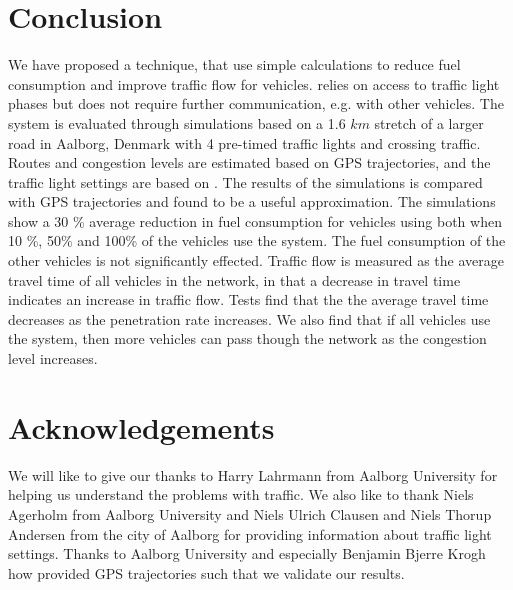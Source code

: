 \section{Conclusion}\label{sec:Conclusion}
We have proposed a technique, \tech that use simple calculations to reduce fuel consumption and improve traffic flow for vehicles.
\tech relies on access to traffic light phases but does not require further communication, e.g. with other vehicles.
The system is evaluated through simulations based on a 1.6 $km$ stretch of a larger road in Aalborg, Denmark with 4 pre-timed traffic lights and crossing traffic.
Routes and congestion levels are estimated based on GPS trajectories, and the traffic light settings are based on \cite{vejtrafik}.
The results of the simulations is compared with GPS trajectories and found to be a useful approximation.
The simulations show a 30 \% average reduction in fuel consumption for vehicles using \tech both when 10 \%, 50\% and 100\% of the vehicles use the system.
The fuel consumption of the other vehicles is not significantly effected.
Traffic flow is measured as the average travel time of all vehicles in the network, in that a decrease in travel time indicates an increase in traffic flow.
Tests find that the the average travel time decreases as the penetration rate increases. 
We also find that if all vehicles use the system, then more vehicles can pass though the network as the congestion level increases.

\section*{Acknowledgements}
We will like to give our thanks to Harry Lahrmann from Aalborg University for helping us understand the problems with traffic.
We also like to thank Niels Agerholm from Aalborg University and Niels Ulrich Clausen and Niels Thorup Andersen from the city of Aalborg for providing information about traffic light settings.
Thanks to Aalborg University and especially Benjamin Bjerre Krogh how provided GPS trajectories such that we validate our results.



